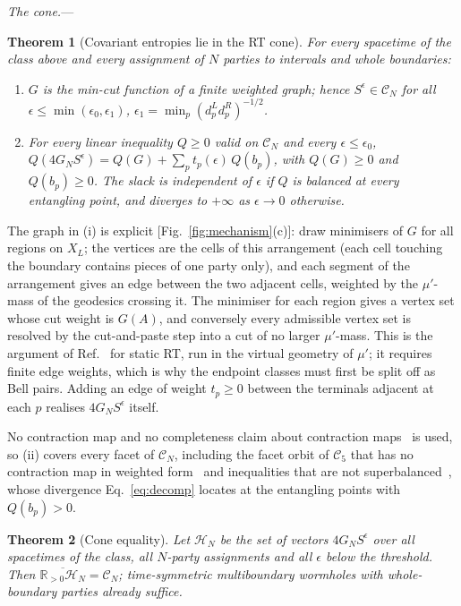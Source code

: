 \documentclass[aps,prl,twocolumn,superscriptaddress,nofootinbib,amsmath,amssymb]{revtex4-2}
\newtheorem{theorem}{Theorem}
\theoremstyle{definition}
\newcommand{\CN}{\mathcal{C}_N}
\newcommand{\eps}{\epsilon}
\begin{document}
\emph{The cone.}---%
\begin{theorem}[Covariant entropies lie in the RT cone]\label{thm:main}
For every spacetime of the class above and every assignment of $N$ parties to intervals and whole boundaries:
\begin{enumerate}
\item[(i)] $G$ is the min-cut function of a finite weighted graph; hence $S^\eps\in\CN$ for all
$\eps\le\min(\eps_0,\eps_1)$, $\eps_1=\min_p(d_p^Ld_p^R)^{-1/2}$.
\item[(ii)] For every linear inequality $Q\ge0$ valid on $\CN$ and every $\eps\le\eps_0$,
$Q(4G_NS^\eps)=Q(G)+\sum_pt_p(\eps)\,Q(b_p)$, with $Q(G)\ge0$ and $Q(b_p)\ge0$. The slack is independent of $\eps$
if $Q$ is balanced at every entangling point, and diverges to $+\infty$ as $\eps\to0$ otherwise.
\end{enumerate}
\end{theorem}

The graph in (i) is explicit [Fig.~\ref{fig:mechanism}(c)]: draw minimisers of $G$ for all regions on $X_L$;
the vertices are the cells of this arrangement (each cell touching the boundary contains pieces of one party
only), and each segment of the arrangement gives an edge between the two adjacent cells, weighted by the
$\mu'$-mass of the geodesics crossing it. The minimiser for each region gives a vertex set whose cut weight is $G(A)$, and
conversely every admissible vertex set is resolved by the cut-and-paste step into a cut of no larger $\mu'$-mass.
This is the argument of Ref.~\cite{Bao2015} for static RT, run in the virtual geometry of $\mu'$; it requires
finite edge weights, which is why the endpoint classes must first be split off as Bell pairs. Adding an edge of
weight $t_p\ge0$ between the terminals adjacent at each $p$ realises $4G_NS^\eps$ itself.

No contraction map and no completeness claim about contraction maps~\cite{BaoFuruyaNaskar2025} is used, so (ii)
covers every facet of $\CN$, including the facet orbit of $\mathcal{C}_5$ that has no contraction map in
weighted form~\cite{AvisHernandezCuenca2023} and inequalities that are not superbalanced~\cite{JuCzech2026}, whose divergence Eq.~\eqref{eq:decomp} locates
at the entangling points with $Q(b_p)>0$.

\begin{theorem}[Cone equality]\label{thm:equality}
Let $\mathcal{H}_N$ be the set of vectors $4G_NS^\eps$ over all spacetimes of the class, all $N$-party
assignments and all $\eps$ below the threshold. Then $\overline{\mathbb{R}_{>0}\mathcal{H}_N}=\CN$;
time-symmetric multiboundary wormholes with whole-boundary parties already suffice.
\end{theorem}
\end{document}
